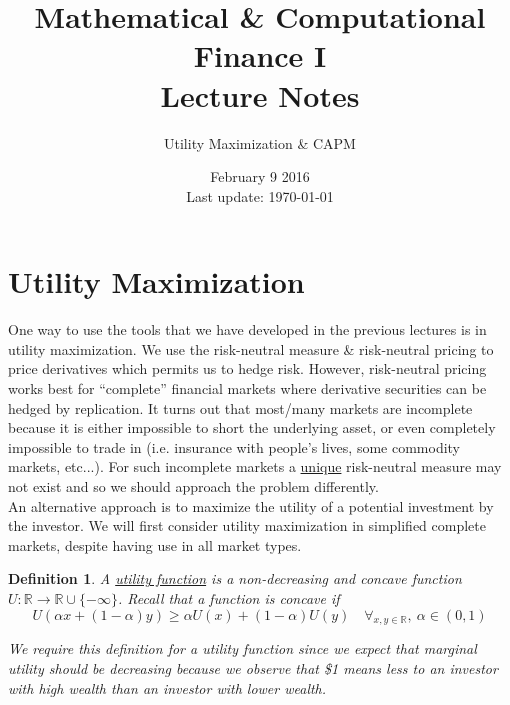 \documentclass[12pt]{article}
\newtheorem{definition}{Definition}
\newlength\tindent
\renewcommand{\indent}{\hspace*{\tindent}}
\newcommand{\R}{\mathbb R}
\begin{document}
 
 
\title{Mathematical \& Computational Finance I\\Lecture Notes}
\author{Utility Maximization \& CAPM}
\date{February 9 2016 \\ Last update: \today{}}
\maketitle

\section{Utility Maximization}

\indent One way to use the tools that we have developed in the previous lectures is in utility maximization. We use the risk-neutral measure \& risk-neutral pricing to price derivatives which permits us to hedge risk. However, risk-neutral pricing works best for ``complete'' financial markets where derivative securities can be hedged by replication. It turns out that most/many markets are incomplete because it is either impossible to short the underlying asset, or even completely impossible to trade in (i.e. insurance with people's lives, some commodity markets, etc...). For such incomplete markets a \underline{unique} risk-neutral measure may not exist and so we should approach the problem differently. \\

\indent An alternative approach is to maximize the utility of a potential investment by the investor. We will first consider utility maximization in simplified complete markets, despite having use in all market types.

\begin{definition} A \underline{utility function} is a non-decreasing and concave function $U:\R \to \R\cup\{-\infty\}$. Recall that a function is concave if
\begin{equation*}
	U(\alpha x + (1 - \alpha) y) \geq \alpha U(x) + (1 - \alpha)U(y) \quad \forall_{x,y \in \R},~\alpha\in(0,1)
\end{equation*}

\indent We require this definition for a utility function since we expect that marginal utility should be decreasing because we observe that \$1 means less to an investor with high wealth than an investor with lower wealth.
\end{definition}
\end{document}
